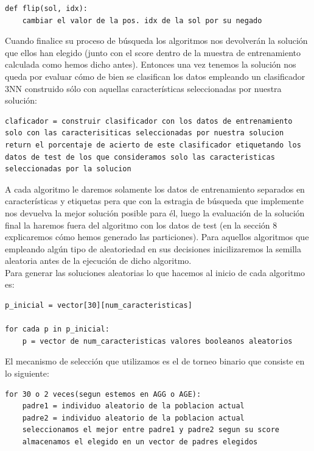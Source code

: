 \documentclass[10pt,a4paper]{article}
\begin{document}
\begin{lstlisting}
def flip(sol, idx):
	cambiar el valor de la pos. idx de la sol por su negado
\end{lstlisting}

Cuando finalice su proceso de búsqueda los algoritmos nos devolverán la solución que ellos han elegido (junto con el score dentro de la muestra de entrenamiento calculada como hemos dicho antes). Entonces una vez tenemos la solución nos queda por evaluar cómo de bien se clasifican los datos empleando un clasificador 3NN construido sólo con aquellas características seleccionadas por nuestra solución:\\

\begin{lstlisting}
claficador = construir clasificador con los datos de entrenamiento solo con las caracterisiticas seleccionadas por nuestra solucion
return el porcentaje de acierto de este clasificador etiquetando los datos de test de los que consideramos solo las caracteristicas seleccionadas por la solucion
\end{lstlisting}

A cada algoritmo le daremos solamente los datos de entrenamiento separados en características y etiquetas pera que con la estragia de búsqueda que implemente nos devuelva la mejor solución posible para él, luego la evaluación de la solución final la haremos fuera del algoritmo con los datos de test (en la sección 8 explicaremos cómo hemos generado las particiones). Para aquellos algoritmos que empleando algún tipo de aleatoriedad en sus decisiones inicilizaremos la semilla aleatoria antes de la ejecución de dicho algoritmo.\\

Para generar las soluciones aleatorias lo que hacemos al inicio de cada algoritmo es:\\

\begin{lstlisting}
p_inicial = vector[30][num_caracteristicas]

for cada p in p_inicial:
	p = vector de num_caracteristicas valores booleanos aleatorios
\end{lstlisting}

El mecanismo de selección que utilizamos es el de torneo binario que consiste en lo siguiente:\\

\begin{lstlisting}
for 30 o 2 veces(segun estemos en AGG o AGE):
	padre1 = individuo aleatorio de la poblacion actual
	padre2 = individuo aleatorio de la poblacion actual
	seleccionamos el mejor entre padre1 y padre2 segun su score
	almacenamos el elegido en un vector de padres elegidos
\end{lstlisting}
\end{document}
